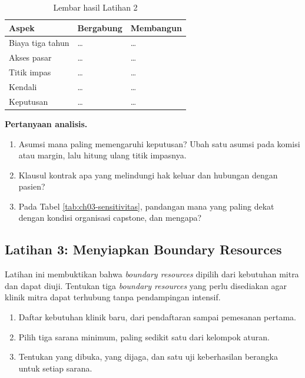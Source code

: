 \begin{table}[!htb]
  \centering
  \caption{Lembar hasil Latihan 2}
  \label{tab:ch03-lat2-hasil}
  \small
  \begin{tabularx}{\textwidth}{Z{2.3cm}YY}
    \hline
    \textbf{Aspek} & \textbf{Bergabung} & \textbf{Membangun} \\ \hline
    Biaya tiga tahun & \dots & \dots \\ \hline
    Akses pasar & \dots & \dots \\ \hline
    Titik impas & \dots & \dots \\ \hline
    Kendali & \dots & \dots \\ \hline
    Keputusan & \dots & \dots \\ \hline
  \end{tabularx}
\end{table}

\textbf{Pertanyaan analisis.}
\begin{enumerate}
  \item Asumsi mana paling memengaruhi keputusan? Ubah satu asumsi pada komisi atau margin, lalu hitung ulang titik
        impasnya.
  \item Klausul kontrak apa yang melindungi hak keluar dan hubungan dengan pasien?
  \item Pada Tabel \ref{tab:ch03-sensitivitas}, pandangan mana yang paling dekat dengan kondisi organisasi capstone,
        dan mengapa?
\end{enumerate}

\subsection*{Latihan 3: Menyiapkan Boundary Resources}

Latihan ini membuktikan bahwa \textit{boundary resources} dipilih dari kebutuhan mitra dan dapat diuji. Tentukan tiga
\textit{boundary resources} yang perlu disediakan agar klinik mitra dapat terhubung tanpa pendampingan intensif.

\begin{enumerate}
  \item Daftar kebutuhan klinik baru, dari pendaftaran sampai pemesanan pertama.
  \item Pilih tiga sarana minimum, paling sedikit satu dari kelompok aturan.
  \item Tentukan yang dibuka, yang dijaga, dan satu uji keberhasilan berangka untuk setiap sarana.
\end{enumerate}

